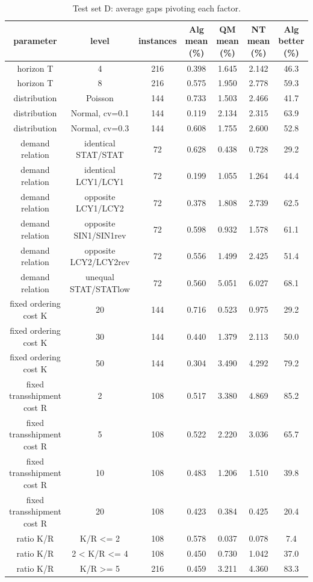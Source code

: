 \begin{table}[H]
\centering
\caption{Test set D: average gaps pivoting each factor.}
\label{tab:test3_D_pivot}
\begin{tabular}{ccccccc}
\toprule
parameter & level & instances & Alg mean (\%) & QM mean (\%) & NT mean (\%) & Alg better (\%) \\
\midrule
horizon T & 4 & 216 & 0.398 & 1.645 & 2.142 & 46.3 \\
horizon T & 8 & 216 & 0.575 & 1.950 & 2.778 & 59.3 \\
distribution & Poisson & 144 & 0.733 & 1.503 & 2.466 & 41.7 \\
distribution & Normal, cv=0.1 & 144 & 0.119 & 2.134 & 2.315 & 63.9 \\
distribution & Normal, cv=0.3 & 144 & 0.608 & 1.755 & 2.600 & 52.8 \\
demand relation & identical STAT/STAT & 72 & 0.628 & 0.438 & 0.728 & 29.2 \\
demand relation & identical LCY1/LCY1 & 72 & 0.199 & 1.055 & 1.264 & 44.4 \\
demand relation & opposite LCY1/LCY2 & 72 & 0.378 & 1.808 & 2.739 & 62.5 \\
demand relation & opposite SIN1/SIN1rev & 72 & 0.598 & 0.932 & 1.578 & 61.1 \\
demand relation & opposite LCY2/LCY2rev & 72 & 0.556 & 1.499 & 2.425 & 51.4 \\
demand relation & unequal STAT/STATlow & 72 & 0.560 & 5.051 & 6.027 & 68.1 \\
fixed ordering cost K & 20 & 144 & 0.716 & 0.523 & 0.975 & 29.2 \\
fixed ordering cost K & 30 & 144 & 0.440 & 1.379 & 2.113 & 50.0 \\
fixed ordering cost K & 50 & 144 & 0.304 & 3.490 & 4.292 & 79.2 \\
fixed transshipment cost R & 2 & 108 & 0.517 & 3.380 & 4.869 & 85.2 \\
fixed transshipment cost R & 5 & 108 & 0.522 & 2.220 & 3.036 & 65.7 \\
fixed transshipment cost R & 10 & 108 & 0.483 & 1.206 & 1.510 & 39.8 \\
fixed transshipment cost R & 20 & 108 & 0.423 & 0.384 & 0.425 & 20.4 \\
ratio K/R & K/R <= 2 & 108 & 0.578 & 0.037 & 0.078 & 7.4 \\
ratio K/R & 2 < K/R <= 4 & 108 & 0.450 & 0.730 & 1.042 & 37.0 \\
ratio K/R & K/R >= 5 & 216 & 0.459 & 3.211 & 4.360 & 83.3 \\

\end{tabular}
\end{table}
